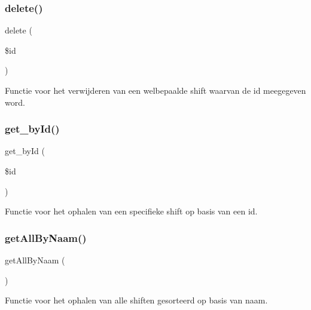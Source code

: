 \subsubsection{\texorpdfstring{delete()}{delete()}}
{\footnotesize\ttfamily delete (\begin{DoxyParamCaption}\item[{}]{\$id }\end{DoxyParamCaption})}



Functie voor het verwijderen van een welbepaalde shift waarvan de id meegegeven word. 

\mbox{\label{class_shiften___model_a98d28a4d9a29d40c5a8aa0176f19a919}} 
\subsubsection{\texorpdfstring{get\+\_\+by\+Id()}{get\_byId()}}
{\footnotesize\ttfamily get\+\_\+by\+Id (\begin{DoxyParamCaption}\item[{}]{\$id }\end{DoxyParamCaption})}



Functie voor het ophalen van een specifieke shift op basis van een id. 

\mbox{\label{class_shiften___model_a2b035b1ffd1cbe651b35bb3e53d72c09}} 
\subsubsection{\texorpdfstring{get\+All\+By\+Naam()}{getAllByNaam()}}
{\footnotesize\ttfamily get\+All\+By\+Naam (\begin{DoxyParamCaption}{ }\end{DoxyParamCaption})}



Functie voor het ophalen van alle shiften gesorteerd op basis van naam. 

\mbox{\label{class_shiften___model_a537c83774b71a66979239cdffbb584d4}} 
